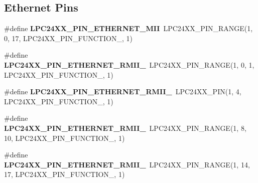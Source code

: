 \subsection*{Ethernet Pins}
\begin{DoxyCompactItemize}
\item 
\mbox{\label{group__lpc24xx__io_ga56c3557fe8ee5bb62e80b8038dc2e922}} 
\#define {\bfseries L\+P\+C24\+X\+X\+\_\+\+P\+I\+N\+\_\+\+E\+T\+H\+E\+R\+N\+E\+T\+\_\+\+M\+II}~L\+P\+C24\+X\+X\+\_\+\+P\+I\+N\+\_\+\+R\+A\+N\+GE(1, 0, 17, L\+P\+C24\+X\+X\+\_\+\+P\+I\+N\+\_\+\+F\+U\+N\+C\+T\+I\+O\+N\+\_, 1)
\item 
\mbox{\label{group__lpc24xx__io_ga6539611c88b0719d27798a3928aa7044}} 
\#define {\bfseries L\+P\+C24\+X\+X\+\_\+\+P\+I\+N\+\_\+\+E\+T\+H\+E\+R\+N\+E\+T\+\_\+\+R\+M\+I\+I\+\_}~L\+P\+C24\+X\+X\+\_\+\+P\+I\+N\+\_\+\+R\+A\+N\+GE(1, 0, 1, L\+P\+C24\+X\+X\+\_\+\+P\+I\+N\+\_\+\+F\+U\+N\+C\+T\+I\+O\+N\+\_, 1)
\item 
\mbox{\label{group__lpc24xx__io_gad698561375d30d10f5d5c49a019af3f9}} 
\#define {\bfseries L\+P\+C24\+X\+X\+\_\+\+P\+I\+N\+\_\+\+E\+T\+H\+E\+R\+N\+E\+T\+\_\+\+R\+M\+I\+I\+\_}~L\+P\+C24\+X\+X\+\_\+\+P\+IN(1, 4, L\+P\+C24\+X\+X\+\_\+\+P\+I\+N\+\_\+\+F\+U\+N\+C\+T\+I\+O\+N\+\_, 1)
\item 
\mbox{\label{group__lpc24xx__io_ga9db693d631718f30dbce31503d9ab642}} 
\#define {\bfseries L\+P\+C24\+X\+X\+\_\+\+P\+I\+N\+\_\+\+E\+T\+H\+E\+R\+N\+E\+T\+\_\+\+R\+M\+I\+I\+\_}~L\+P\+C24\+X\+X\+\_\+\+P\+I\+N\+\_\+\+R\+A\+N\+GE(1, 8, 10, L\+P\+C24\+X\+X\+\_\+\+P\+I\+N\+\_\+\+F\+U\+N\+C\+T\+I\+O\+N\+\_, 1)
\item 
\mbox{\label{group__lpc24xx__io_gaf38c054b1793964527785272ea63bd96}} 
\#define {\bfseries L\+P\+C24\+X\+X\+\_\+\+P\+I\+N\+\_\+\+E\+T\+H\+E\+R\+N\+E\+T\+\_\+\+R\+M\+I\+I\+\_}~L\+P\+C24\+X\+X\+\_\+\+P\+I\+N\+\_\+\+R\+A\+N\+GE(1, 14, 17, L\+P\+C24\+X\+X\+\_\+\+P\+I\+N\+\_\+\+F\+U\+N\+C\+T\+I\+O\+N\+\_, 1)
\end{DoxyCompactItemize}
